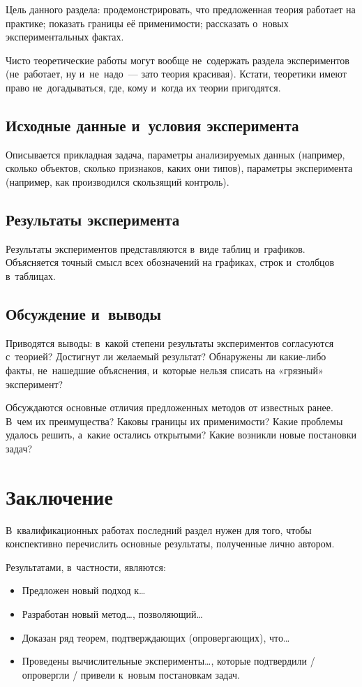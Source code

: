 \documentclass[12pt,fleqn]{article}
\begin{document}
Цель данного раздела:
продемонстрировать, что предложенная теория работает на практике;
показать границы её применимости;
рассказать о~новых экспериментальных фактах.

Чисто теоретические работы могут вообще не~содержать раздела экспериментов
(не~работает, ну и~не~надо~--- зато теория красивая).
Кстати, теоретики имеют право не~догадываться, где, кому и~когда их теории пригодятся.

\subsection{Исходные данные и~условия эксперимента}
Описывается прикладная задача, параметры анализируемых данных 
(например, сколько объектов, сколько признаков, каких они типов), 
параметры эксперимента 
(например, как производился скользящий контроль). 

\subsection{Результаты эксперимента}
Результаты экспериментов представляются в~виде таблиц и~графиков. 
Объясняется точный смысл всех обозначений на графиках, строк и~столбцов в~таблицах. 

\subsection{Обсуждение и~выводы}
Приводятся выводы: 
в~какой степени результаты экспериментов согласуются с~теорией? 
Достигнут ли желаемый результат? 
Обнаружены ли какие-либо факты, не~нашедшие объяснения, и~которые нельзя списать на «грязный» эксперимент?

Обсуждаются основные отличия предложенных методов от известных ранее. 
В~чем их преимущества? 
Каковы границы их применимости? 
Какие проблемы удалось решить, а~какие остались открытыми? 
Какие возникли новые постановки задач?

\section{Заключение}

В~квалификационных работах последний раздел нужен для того, чтобы 
конспективно перечислить основные результаты, полученные лично автором. 

Результатами, в~частности, являются:
\begin{itemize}
\item 
    Предложен новый подход к\dots
\item 
    Разработан новый метод\dots, позволяющий\dots
\item 
    Доказан ряд теорем, подтверждающих (опровергающих), что\dots
\item 
    Проведены вычислительные эксперименты\dots,
    которые подтвердили / опровергли / привели к~новым постановкам задач.
\end{itemize}
    
\end{document}
